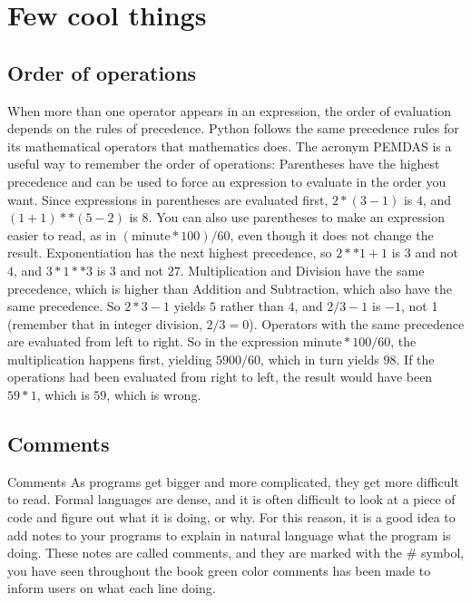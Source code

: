 \chapter{Few cool things}
\section{Order of operations}
When more than one operator appears in an expression, the order of evaluation depends on the rules of precedence. Python follows the same precedence rules for its mathematical operators that mathematics does. The acronym PEMDAS is a useful way to remember the order of operations: Parentheses have the highest precedence and can be used to force an expression to evaluate in the order you want. Since expressions in parentheses are evaluated first, $2* (3-1)$ is $4$, and $(1+1)**(5-2)$ is $8$. You can also use parentheses to make an expression easier to read, as in $(\text{minute} * 100)/60$, even though it does not change the result. Exponentiation has the next highest precedence, so $2**1+1$ is $3$ and not $4$, and $3*1**3$ is $3$ and not $27$. Multiplication and Division have the same precedence, which is higher than Addition and Subtraction, which also have the same precedence. So $2*3-1$ yields $5$ rather than $4$, and $2/3-1$ is $-1$, not 1 (remember that in integer division, $2/3=0$). Operators with the same precedence are evaluated from left to right. So in the expression $\text{minute}*100/60$, the multiplication happens first, yielding $5900/60$, which in turn yields $98$. If the operations had been evaluated from right to left, the result would have been $59*1$, which is $59$, which is wrong.

\section{Comments}
Comments As programs get bigger and more complicated, they get more difficult to read. Formal languages are dense, and it is often difficult to look at a piece of code and figure out what it is doing, or why. For this reason, it is a good idea to add notes to your programs to explain in natural language what the program is doing. These notes are called comments, and they are marked with the \# symbol, you have seen throughout the book green color comments has been made to inform users on what each line doing.